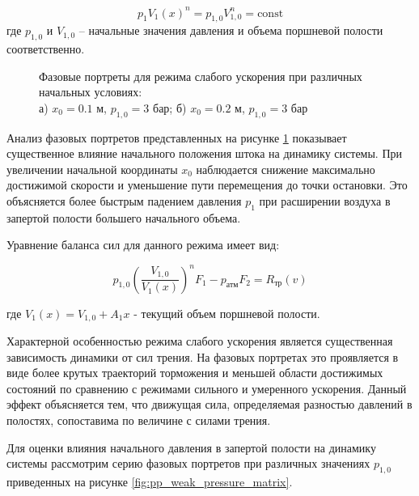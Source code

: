 \begin{equation*}
	p_1V_1(x)^n = p_{1,0}V_{1,0}^n = \text{const}
\end{equation*}
где $p_{1,0}$ и $V_{1,0}$ -- начальные значения давления и объема поршневой полости соответственно.

\begin{figure}[htbp]
	\caption{Фазовые портреты для режима слабого ускорения при различных начальных условиях:\\
		а) $x_0 = \num{0.1}$ м, $p_{1,0} = 3$ бар; б) $x_0 = \num{0.2}$ м, $p_{1,0} = 3$ бар}
	\label{fig:pp_weak_acceleration}
\end{figure}

Анализ фазовых портретов представленных на рисунке \ref{fig:pp_weak_acceleration} показывает существенное влияние начального
положения штока на динамику системы. При увеличении начальной координаты $x_0$ наблюдается снижение максимально достижимой
скорости и уменьшение пути перемещения до точки остановки. Это объясняется более быстрым падением давления $p_1$ при расширении
воздуха в запертой полости большего начального объема.

Уравнение баланса сил для данного режима имеет вид:

\begin{equation*}
	p_{1,0}\left(\frac{V_{1,0}}{V_1(x)}\right)^nF_1 - p_\text{атм}F_2 = R_\text{тр}(v)
\end{equation*}

где $V_1(x) = V_{1,0} + A_1x$ - текущий объем поршневой полости.

Характерной особенностью режима слабого ускорения является существенная зависимость динамики
от сил трения. На фазовых портретах это проявляется в виде более крутых траекторий
торможения и меньшей области достижимых состояний по сравнению с режимами сильного и
умеренного ускорения. Данный эффект объясняется тем, что движущая сила, определяемая
разностью давлений в полостях, сопоставима по величине с силами трения.

Для оценки влияния начального давления в запертой полости на динамику системы рассмотрим
серию фазовых портретов при различных значениях $p_{1,0}$ приведенных на рисунке \ref{fig:pp_weak_pressure_matrix}.

